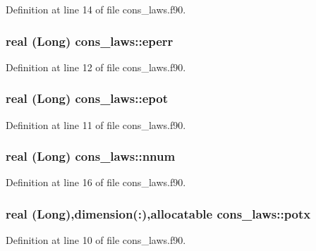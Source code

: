 Definition at line 14 of file cons\_\-laws.f90.

\hypertarget{namespacecons__laws_a1fa58c36c9b57ed4261fddafdadfb924}{
\subsubsection[{eperr}]{\setlength{\rightskip}{0pt plus 5cm}real (Long) {\bf cons\_\-laws::eperr}}}
\label{namespacecons__laws_a1fa58c36c9b57ed4261fddafdadfb924}


Definition at line 12 of file cons\_\-laws.f90.

\hypertarget{namespacecons__laws_a63e2f83fe00d6af9a68267f70281beac}{
\subsubsection[{epot}]{\setlength{\rightskip}{0pt plus 5cm}real (Long) {\bf cons\_\-laws::epot}}}
\label{namespacecons__laws_a63e2f83fe00d6af9a68267f70281beac}


Definition at line 11 of file cons\_\-laws.f90.

\hypertarget{namespacecons__laws_ac8202a23f94b9d534dfc7d5169d2e4bf}{
\subsubsection[{nnum}]{\setlength{\rightskip}{0pt plus 5cm}real (Long) {\bf cons\_\-laws::nnum}}}
\label{namespacecons__laws_ac8202a23f94b9d534dfc7d5169d2e4bf}


Definition at line 16 of file cons\_\-laws.f90.

\hypertarget{namespacecons__laws_a5e16e552d92dd5dd52c3cdc8600e62fe}{
\subsubsection[{potx}]{\setlength{\rightskip}{0pt plus 5cm}real (Long),dimension(:),allocatable {\bf cons\_\-laws::potx}}}
\label{namespacecons__laws_a5e16e552d92dd5dd52c3cdc8600e62fe}


Definition at line 10 of file cons\_\-laws.f90.

